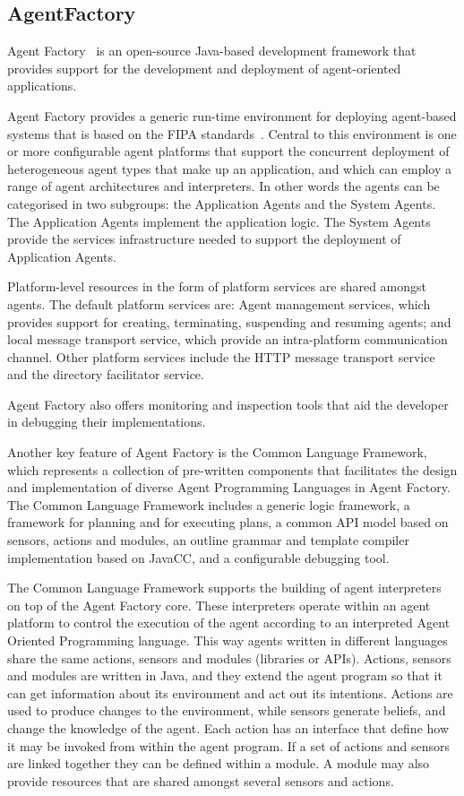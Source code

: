 \documentclass[a4paper,12pt,oneside,fleqn]{book} %
\theoremstyle{plain}
\theoremstyle{definition}
\theoremstyle{remark}
\begin{document}
\subsection{AgentFactory} %

Agent Factory~\cite{collier2002agent} is an open-source Java-based
development framework that provides support for the development and
deployment of agent-oriented applications.

Agent Factory provides a generic run-time environment for deploying
agent-based systems that is based on the FIPA
standards~\cite{poslad2000fipa}.  Central to this environment is one or
more configurable agent platforms that support the concurrent deployment of
heterogeneous agent types that make up an application, and which can employ
a range of agent architectures and interpreters. In other words the agents
can be categorised in two subgroups: the Application Agents and the System
Agents. The Application Agents implement the application logic. The System
Agents provide the services infrastructure needed to support the deployment
of Application Agents. 

Platform-level resources in the form of platform services are shared
amongst agents. The default platform services are: Agent management
services, which provides support for creating, terminating, suspending and
resuming agents; and local message transport service, which provide an
intra-platform communication channel. Other platform services include the
HTTP message transport service and the directory facilitator service.

Agent Factory also offers monitoring and inspection tools that aid the
developer in debugging their implementations.

Another key feature of Agent Factory is the Common Language Framework,
which represents a collection of pre-written components that facilitates
the design and implementation of diverse Agent Programming Languages in
Agent Factory\null. The Common Language Framework includes a generic logic
framework, a framework for planning and for executing plans, a common API
model based on sensors, actions and modules, an outline grammar and
template compiler implementation based on JavaCC, and a configurable
debugging tool.

The Common Language Framework supports the building of agent interpreters
on top of the Agent Factory core. These interpreters operate within an
agent platform to control the execution of the agent according to an
interpreted Agent Oriented Programming language. This way agents written in
different languages share the same actions, sensors and modules (libraries
or APIs). Actions, sensors and modules are written in Java, and they extend
the agent program so that it can get information about its environment and
act out its intentions. Actions are used to produce changes to the
environment, while sensors generate beliefs, and change the knowledge of
the agent. Each action has an interface that define how it may be invoked
from within the agent program. If a set of actions and sensors are linked
together they can be defined within a module. A module may also provide
resources that are shared amongst several sensors and actions. 
\end{document}
